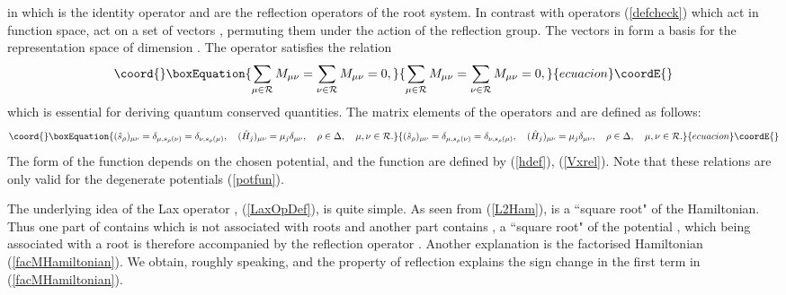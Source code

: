 \documentclass[a4paper,12pt]{article}
\begin{document}
in which \coordHE{} is the identity
operator and \coordHE{} are the reflection
operators  of the root system.
In contrast with \coordHE{} operators
(\ref{defcheck}) which act in function space,
\coordHE{} act on a set of
\coordHE{} vectors
\coordHE{}, permuting them
under the action of the reflection group.
The vectors in \coordHE{} form a basis for
the representation space \coordHE{} of dimension \coordHE{}.
The operator \coordHE{} satisfies the relation
\begin{equation}\coord{}\boxEquation{
   \sum_{\mu\in{\cal R}}M_{\mu\nu}=
   \sum_{\nu\in{\cal R}}M_{\mu\nu}=0,
   \label{sumMzero}
}{
   \sum_{\mu\in{\cal R}}M_{\mu\nu}=
   \sum_{\nu\in{\cal R}}M_{\mu\nu}=0,
   }{ecuacion}\coordE{}\end{equation}
which is essential for deriving quantum conserved quantities.
The matrix elements of the operators
\coordHE{} and \coordHE{} are defined as follows:
\begin{equation}\coord{}\boxEquation{
   (\hat{s}_{\rho})_{\mu\nu}=\delta_{\mu,s_\rho(\nu)}=
      \delta_{\nu,s_\rho(\mu)}, \quad
   (\hat{H}_{j})_{\mu\nu}=\mu_j\delta_{\mu\nu},\quad \rho\in\Delta,
   \quad
   \mu, \nu\in{\cal R}.
   \label{sHdef}
}{
   (\hat{s}_{\rho})_{\mu\nu}=\delta_{\mu,s_\rho(\nu)}=
      \delta_{\nu,s_\rho(\mu)}, \quad
   (\hat{H}_{j})_{\mu\nu}=\mu_j\delta_{\mu\nu},\quad \rho\in\Delta,
   \quad
   \mu, \nu\in{\cal R}.
   }{ecuacion}\coordE{}\end{equation}
The form of the function \coordHE{} depends on the chosen potential, and
the function \coordHE{}  are defined by (\ref{hdef}), (\ref{Vxrel}).
Note that these relations are only valid for the degenerate potentials
(\ref{potfun}).

The underlying idea of the Lax operator \coordHE{}, (\ref{LaxOpDef}),
is quite simple.
As seen from (\ref{L2Ham}), \coordHE{} is a ``square root"
of the Hamiltonian.
Thus one part of \coordHE{} contains \coordHE{} which is not associated with
roots and another part contains \coordHE{}, a ``square root"
of the potential
\coordHE{}, which being associated with a root \myHighlight{\(\rho\)}\coordHE{}
is therefore accompanied by the reflection operator \coordHE{}.
Another explanation is the factorised Hamiltonian \coordHE{}
(\ref{facMHamiltonian}). We obtain, roughly speaking, \coordHE{} and the property of
reflection
\coordHE{} explains the sign change in the first term in
(\ref{facMHamiltonian}).
\end{document}
